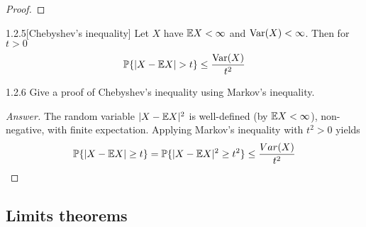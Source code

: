 \begin{proof}
\end{proof}

\begin{cor}{1.2.5}[Chebyshev's inequality]\label{1.2.5}
Let $X$ have $\mathbb{E} X <\infty$ and $\text{Var}(X) <\infty$. Then for $t > 0$
\begin{align*}
    \mathbb{P} \{ |X -\mathbb{E} X| > t\} \leq \frac{\text{Var}(X)} {t^2}
\end{align*}
\end{cor}

\begin{ex}{1.2.6}
Give a proof of Chebyshev's inequality using Markov's inequality.
\end{ex}
\begin{proof}[Answer]
The random variable $|X - \mathbb{E} X|^2$ is well-defined (by $\mathbb{E} X < \infty$), non-negative, with finite expectation. 
Applying Markov's inequality with $t^2>0$ yields
\begin{align*}
    \mathbb{P} \{|X -\mathbb{E} X| \geq t\} =
    \mathbb{P} \{|X -\mathbb{E} X|^2 \geq t^2\} \leq \frac {Var(X)}{t^2}
\end{align*}
\end{proof}


\subsection{Limits theorems}